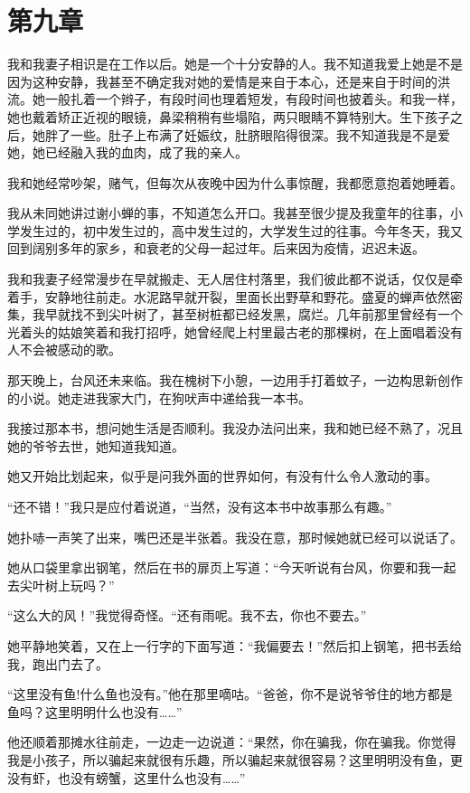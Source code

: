 \documentclass[lang=cn]{elegantpaper}
\begin{document}
\section{第九章}
\label{sec:org7a78b32}

我和我妻子相识是在工作以后。她是一个十分安静的人。我不知道我爱上她是不是因为这种安静，我甚至不确定我对她的爱情是来自于本心，还是来自于时间的洪流。她一般扎着一个辫子，有段时间也理着短发，有段时间也披着头。和我一样，她也戴着矫正近视的眼镜，鼻梁稍稍有些塌陷，两只眼睛不算特别大。生下孩子之后，她胖了一些。肚子上布满了妊娠纹，肚脐眼陷得很深。我不知道我是不是爱她，她已经融入我的血肉，成了我的亲人。

我和她经常吵架，赌气，但每次从夜晚中因为什么事惊醒，我都愿意抱着她睡着。

我从未同她讲过谢小蝉的事，不知道怎么开口。我甚至很少提及我童年的往事，小学发生过的，初中发生过的，高中发生过的，大学发生过的往事。今年冬天，我又回到阔别多年的家乡，和衰老的父母一起过年。后来因为疫情，迟迟未返。

我和我妻子经常漫步在早就搬走、无人居住村落里，我们彼此都不说话，仅仅是牵着手，安静地往前走。水泥路早就开裂，里面长出野草和野花。盛夏的蝉声依然密集，我早就找不到尖叶树了，甚至树桩都已经发黑，腐烂。几年前那里曾经有一个光着头的姑娘笑着和我打招呼，她曾经爬上村里最古老的那棵树，在上面唱着没有人不会被感动的歌。

那天晚上，台风还未来临。我在槐树下小憩，一边用手打着蚊子，一边构思新创作的小说。她走进我家大门，在狗吠声中递给我一本书。

我接过那本书，想问她生活是否顺利。我没办法问出来，我和她已经不熟了，况且她的爷爷去世，她知道我知道。

她又开始比划起来，似乎是问我外面的世界如何，有没有什么令人激动的事。

“还不错！”我只是应付着说道，“当然，没有这本书中故事那么有趣。”

她扑哧一声笑了出来，嘴巴还是半张着。我没在意，那时候她就已经可以说话了。

她从口袋里拿出钢笔，然后在书的扉页上写道：“今天听说有台风，你要和我一起去尖叶树上玩吗？”

“这么大的风！”我觉得奇怪。“还有雨呢。我不去，你也不要去。”

她平静地笑着，又在上一行字的下面写道：“我偏要去！”然后扣上钢笔，把书丢给我，跑出门去了。

“这里没有鱼!什么鱼也没有。”他在那里嘀咕。“爸爸，你不是说爷爷住的地方都是鱼吗？这里明明什么也没有……”

他还顺着那摊水往前走，一边走一边说道：“果然，你在骗我，你在骗我。你觉得我是小孩子，所以骗起来就很有乐趣，所以骗起来就很容易？这里明明没有鱼，更没有虾，也没有螃蟹，这里什么也没有……”
\end{document}
